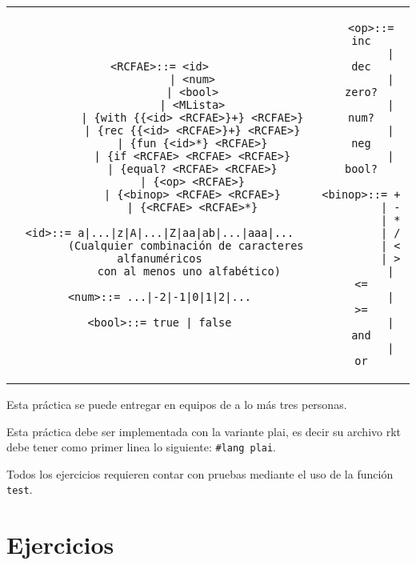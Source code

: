 \documentclass{article}
\begin{document}
\begin{tabular}{c c}
  \begin{minipage}[t]{10cm}
\begin{verbatim}
<RCFAE>::= <id>
          | <num>
          | <bool>
          | <MLista>
          | {with {{<id> <RCFAE>}+} <RCFAE>}
          | {rec {{<id> <RCFAE>}+} <RCFAE>}
          | {fun {<id>*} <RCFAE>}
          | {if <RCFAE> <RCFAE> <RCFAE>}
          | {equal? <RCFAE> <RCFAE>}
          | {<op> <RCFAE>}
          | {<binop> <RCFAE> <RCFAE>}
          | {<RCFAE> <RCFAE>*}

<id>::= a|...|z|A|...|Z|aa|ab|...|aaa|...
        (Cualquier combinación de caracteres alfanuméricos
         con al menos uno alfabético)

<num>::= ...|-2|-1|0|1|2|...

<bool>::= true | false

\end{verbatim}
  \end{minipage}
  &
  \begin{minipage}[t]{6cm}
\begin{verbatim}
   <op>::= inc
         | dec
         | zero?
         | num?
         | neg
         | bool?

<binop>::= +
         | -
         | *
         | /
         | <
         | >
         | <=
         | >=
         | and
         | or

\end{verbatim}
  \end{minipage}
\end{tabular}

Esta práctica se puede entregar en equipos de a lo más tres
personas.

Esta práctica debe ser implementada con la variante plai, es decir
su archivo rkt debe tener como primer linea lo siguiente:
\texttt{\#lang plai}.

Todos los ejercicios requieren contar con pruebas mediante el uso de
la función \texttt{test}.

\section{Ejercicios}
\end{document}

